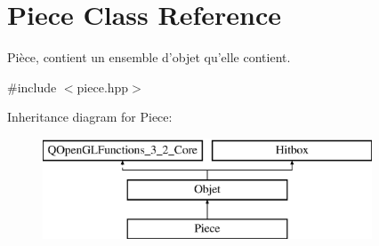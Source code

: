 \hypertarget{class_piece}{\section{Piece Class Reference}
\label{class_piece}
}


Pièce, contient un ensemble d'objet qu'elle contient.  




{\ttfamily \#include $<$piece.\+hpp$>$}

Inheritance diagram for Piece\+:\begin{figure}[H]
\begin{center}
\leavevmode
\includegraphics[height=3.000000cm]{class_piece}
\end{center}
\end{figure}
